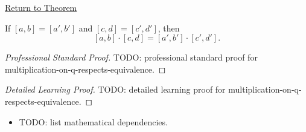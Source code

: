 \newpage
{}
\label{prf:multiplication-on-q-respects-equivalence}

\begin{remark*}[Return]
\hyperref[lem:multiplication-on-q-respects-equivalence]{Return to Theorem}
\end{remark*}

\begin{lemma*}
If $[a,b]=[a',b']$ and $[c,d]=[c',d']$, then
\[
[a,b]\cdot[c,d]=[a',b']\cdot[c',d'].
\]
\end{lemma*}

\begin{proof}[Professional Standard Proof]
\LRAProofBodyStart
TODO: professional standard proof for multiplication-on-q-respects-equivalence.
\end{proof}

\begin{proof}[Detailed Learning Proof]
\LRAProofBodyStart
TODO: detailed learning proof for multiplication-on-q-respects-equivalence.
\end{proof}

\begin{remark*}
\end{remark*}

\begin{dependencies}
\begin{itemize}
  \item TODO: list mathematical dependencies.
\end{itemize}
\end{dependencies}

\clearpage
